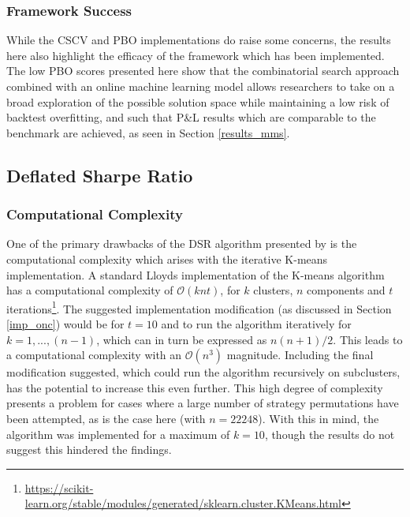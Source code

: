 \documentclass[a4paper,11pt,oneside]{article}
\theoremstyle{plain}
\theoremstyle{definition}
\begin{document}
	
	\subsubsection{Framework Success}
	
	
	While the CSCV and PBO implementations do raise some concerns, the results here also highlight the efficacy of the framework which has been implemented. The low PBO scores presented here show that the combinatorial search approach combined with an online machine learning model allows researchers to take on a broad exploration of the possible solution space while maintaining a low risk of backtest overfitting, and such that P\&L results which are comparable to the benchmark are achieved, as seen in Section \ref{results_mms}.
	
	\newpage

	\subsection{Deflated Sharpe Ratio}\label{results_dsr}	
	
	\subsubsection{Computational Complexity}
	
	One of the primary drawbacks of the DSR algorithm presented by \citet{PradoDSR} is the computational complexity which arises with the iterative K-means implementation. A standard Lloyds implementation of the K-means algorithm has a computational complexity of $\mathcal{O}(knt)$, for $k$ clusters, $n$ components and $t$ iterations\footnote{\url{https://scikit-learn.org/stable/modules/generated/sklearn.cluster.KMeans.html}}. The suggested implementation modification (as discussed in Section \ref{imp_onc}) would be for $t=10$ and to run the algorithm iteratively for $k=1,...,(n-1)$, which can in turn be expressed as $n(n+1)/2$. This leads to a computational complexity with an $\mathcal{O}(n^3)$ magnitude. Including the final modification suggested, which could run the algorithm recursively on subclusters, has the potential to increase this even further. This high degree of complexity presents a problem for cases where a large number of strategy permutations have been attempted, as is the case here (with $n = 22248$). With this in mind, the algorithm was implemented for a maximum of $k=10$, though the results do not suggest this hindered the findings.\newline
	
\end{document}
